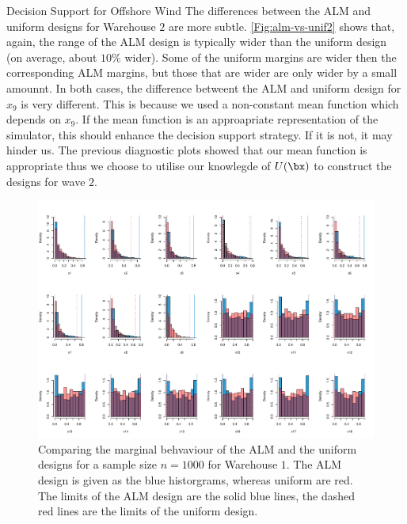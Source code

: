 \begin{chapter}{Decision Support for Offshore Wind \label{Ch:ds-for-ow}}
The differences between the ALM and uniform designs for Warehouse $2$ are more subtle. \cref{Fig:alm-vs-unif2} shows that, again, the range of the ALM design is typically wider than the uniform design (on average, about $10\%$ wider). Some of the uniform margins are wider then the corresponding ALM margins, but those that are wider are only wider by a small amounnt. In both cases, the difference betweent the ALM and uniform design for $x_9$ is very different. This is because we used a non-constant mean function which depends on $x_9$. If the mean function is an approapriate representation of the simulator,  this should enhance the decision support strategy. If it is not, it may hinder us. The previous diagnostic plots showed that our mean function is appropriate thus we choose to utilise our knowlegde of $U(\bx)$ to construct the designs for wave $2$.
\begin{figure}
  \centering
  \includegraphics[width = 7.5in, angle = 90]{fig-ds/alm-vs-unif.pdf}
  \caption{Comparing the marginal behvaviour of the ALM and the uniform designs for a sample size $n = 1000$ for Warehouse $1$. The ALM  design is given as the blue historgrams, whereas uniform are red. The limits of the ALM  design are the solid blue lines, the dashed red lines are the limits of the uniform design.\label{Fig:alm-vs-unif}}
\end{figure}
\begin{figure}
  \centering

\end{figure}
\end{chapter}
